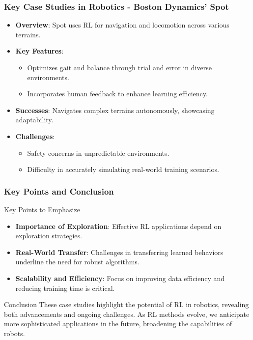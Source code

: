 \documentclass[aspectratio=169]{beamer}
\begin{document}
\begin{frame}[fragile]
    \frametitle{Key Case Studies in Robotics - Boston Dynamics' Spot}
    \begin{itemize}
        \item \textbf{Overview}: Spot uses RL for navigation and locomotion across various terrains.
        \item \textbf{Key Features}:
            \begin{itemize}
                \item Optimizes gait and balance through trial and error in diverse environments.
                \item Incorporates human feedback to enhance learning efficiency.
            \end{itemize}
        \item \textbf{Successes}: Navigates complex terrains autonomously, showcasing adaptability.
        \item \textbf{Challenges}:
            \begin{itemize}
                \item Safety concerns in unpredictable environments.
                \item Difficulty in accurately simulating real-world training scenarios.
            \end{itemize}
    \end{itemize}
\end{frame}

\begin{frame}[fragile]
    \frametitle{Key Points and Conclusion}
    \begin{block}{Key Points to Emphasize}
        \begin{itemize}
            \item \textbf{Importance of Exploration}: Effective RL applications depend on exploration strategies.
            \item \textbf{Real-World Transfer}: Challenges in transferring learned behaviors underline the need for robust algorithms.
            \item \textbf{Scalability and Efficiency}: Focus on improving data efficiency and reducing training time is critical.
        \end{itemize}
    \end{block}
    \begin{block}{Conclusion}
        These case studies highlight the potential of RL in robotics, revealing both advancements and ongoing challenges. As RL methods evolve, we anticipate more sophisticated applications in the future, broadening the capabilities of robots.
    \end{block}
\end{frame}
\end{document}
